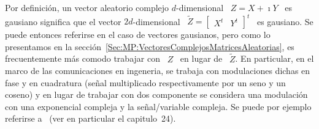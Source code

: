 \label{Sssec:MP:GaussianaComplejas}

Por definici\'on, un vector aleatorio complejo $d$-dimensional \ $Z = X + \imath
Y$ \  es gausiano significa que  el vector $2 d$-dimensional  \ $\widetilde{Z} =
\begin{bmatrix}  X^t &  Y^t \end{bmatrix}^t$  \ es  gausiano. Se  puede entonces
referirse  en el  caso de  vectores gausianos,  pero como  lo presentamos  en la
secci\'on~\ref{Sec:MP:VectoresComplejosMatricesAleatorias},   es  frecuentemente
m\'as comodo trabajar con \ $Z$  \ en lugar de \ $\widetilde{Z}$. En particular,
en  el marco de  las comunicaciones  en ingeneria,  se trabaja  con modulaciones
dichas en fase y en cuadratura (se\~nal multiplicado respectivamente por un seno
y  un coseno)  y  en  lugar de  trabajar  con dos  componente  se considera  una
modulaci\'on  con una exponencial  compleja y  la se\~nal/variable  compleja. Se
puede por ejemplo referirse a~\cite{Lap17} (ver en particular el capitulo~24).

